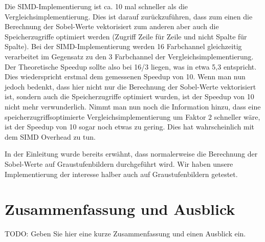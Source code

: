 \documentclass[course=erap]{aspdoc}
\begin{document}
Die SIMD-Implementierung ist ca. 10 mal schneller als die Vergleichsimplementierung.
Dies ist darauf zurückzuführen, dass zum einen die Berechnung der Sobel-Werte vektorisiert zum anderen aber auch die Speicherzugriffe optimiert werden (Zugriff Zeile für Zeile und nicht Spalte für Spalte).
Bei der SIMD-Implementierung werden 16 Farbchannel gleichzeitig verarbeitet im Gegensatz zu den 3 Farbchannel der Vergleichsimplementierung.
Der Theoretische Speedup sollte also bei 16/3 liegen, was in etwa 5,3 entspricht. Dies wiederspricht erstmal dem gemessenen Speedup von 10.
Wenn man nun jedoch bedenkt, dass hier nicht nur die Berechnung der Sobel-Werte vektorisiert ist, sondern auch die Speicherzugriffe optimiert wurden, ist der Speedup von 10 nicht mehr verwunderlich.
Nimmt man nun noch die Information hinzu, dass eine speicherzugriffsoptimierte Vergleichsimplementierung um Faktor 2 schneller wäre, ist der Speedup von 10 sogar noch etwas zu gering.
Dies hat wahrscheinlich mit dem SIMD Overhead zu tun.

In der Einleitung wurde bereits erwähnt, dass normalerweise die Berechnung der Sobel-Werte auf Graustufenbildern durchgeführt wird.
Wir haben unsere Implementierung der interesse halber auch auf Graustufenbildern getestet.
\section{Zusammenfassung und Ausblick}
TODO: Geben Sie hier eine kurze Zusammenfassung und einen Ausblick ein.


\end{document}
